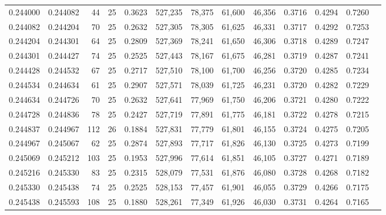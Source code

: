\begin{tabular}{rrrrrrrrrrrrr}
0.244000 & 0.244082 &    44 &  25 &                                     0.3623 & 527,235 &  78,375 &  61,600 &  46,356 & 0.3716 & 0.4294 & 0.7260 \\
0.244082 & 0.244204 &    70 &  25 &                                     0.2632 & 527,305 &  78,305 &  61,625 &  46,331 & 0.3717 & 0.4292 & 0.7253 \\
0.244204 & 0.244301 &    64 &  25 &                                     0.2809 & 527,369 &  78,241 &  61,650 &  46,306 & 0.3718 & 0.4289 & 0.7247 \\
0.244301 & 0.244427 &    74 &  25 &                                     0.2525 & 527,443 &  78,167 &  61,675 &  46,281 & 0.3719 & 0.4287 & 0.7241 \\
0.244428 & 0.244532 &    67 &  25 &                                     0.2717 & 527,510 &  78,100 &  61,700 &  46,256 & 0.3720 & 0.4285 & 0.7234 \\
0.244534 & 0.244634 &    61 &  25 &                                     0.2907 & 527,571 &  78,039 &  61,725 &  46,231 & 0.3720 & 0.4282 & 0.7229 \\
0.244634 & 0.244726 &    70 &  25 &                                     0.2632 & 527,641 &  77,969 &  61,750 &  46,206 & 0.3721 & 0.4280 & 0.7222 \\
0.244728 & 0.244836 &    78 &  25 &                                     0.2427 & 527,719 &  77,891 &  61,775 &  46,181 & 0.3722 & 0.4278 & 0.7215 \\
0.244837 & 0.244967 &   112 &  26 &                                     0.1884 & 527,831 &  77,779 &  61,801 &  46,155 & 0.3724 & 0.4275 & 0.7205 \\
0.244967 & 0.245067 &    62 &  25 &                                     0.2874 & 527,893 &  77,717 &  61,826 &  46,130 & 0.3725 & 0.4273 & 0.7199 \\
0.245069 & 0.245212 &   103 &  25 &                                     0.1953 & 527,996 &  77,614 &  61,851 &  46,105 & 0.3727 & 0.4271 & 0.7189 \\
0.245216 & 0.245330 &    83 &  25 &                                     0.2315 & 528,079 &  77,531 &  61,876 &  46,080 & 0.3728 & 0.4268 & 0.7182 \\
0.245330 & 0.245438 &    74 &  25 &                                     0.2525 & 528,153 &  77,457 &  61,901 &  46,055 & 0.3729 & 0.4266 & 0.7175 \\
0.245438 & 0.245593 &   108 &  25 &                                     0.1880 & 528,261 &  77,349 &  61,926 &  46,030 & 0.3731 & 0.4264 & 0.7165 \\

\end{tabular}

